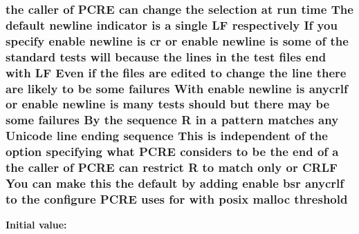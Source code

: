 \subsubsection[{\texorpdfstring{threshold}{threshold}}]{\setlength{\rightskip}{0pt plus 5cm}the caller {\bf of} {\bf P\+C\+RE} {\bf can} change the selection at {\bf run} {\bf time} The {\bf default} {\bf newline} indicator {\bf is} {\bf a} single {\bf LF} {\bf respectively} If you specify enable {\bf newline} {\bf is} {\bf cr} {\bf or} enable {\bf newline} {\bf is} some {\bf of} the standard {\bf tests} will because the {\bf lines} {\bf in} the test {\bf files} {\bf end} {\bf with} {\bf LF} Even {\bf if} the {\bf files} {\bf are} edited {\bf to} change the {\bf line} there {\bf are} likely {\bf to} {\bf be} some failures With enable {\bf newline} {\bf is} anycrlf {\bf or} enable {\bf newline} {\bf is} many {\bf tests} should but there may {\bf be} some failures By the {\bf sequence} {\bf R} {\bf in} {\bf a} {\bf pattern} {\bf matches} {\bf any} {\bf Unicode} {\bf line} ending {\bf sequence} This {\bf is} independent {\bf of} the {\bf option} {\bf specifying} {\bf what} {\bf P\+C\+RE} considers {\bf to} {\bf be} the {\bf end} {\bf of} {\bf a} the caller {\bf of} {\bf P\+C\+RE} {\bf can} restrict {\bf R} {\bf to} {\bf match} only {\bf or} {\bf C\+R\+LF} You {\bf can} {\bf make} {\bf this} the {\bf default} by {\bf adding} enable bsr anycrlf {\bf to} the {\bf configure} {\bf P\+C\+RE} uses for {\bf with} posix {\bf malloc} threshold}\hypertarget{README_8txt_a93c266df6f3f0e8ff534af2940e3f69c}{}\label{README_8txt_a93c266df6f3f0e8ff534af2940e3f69c}
{\bfseries Initial value\+:}
